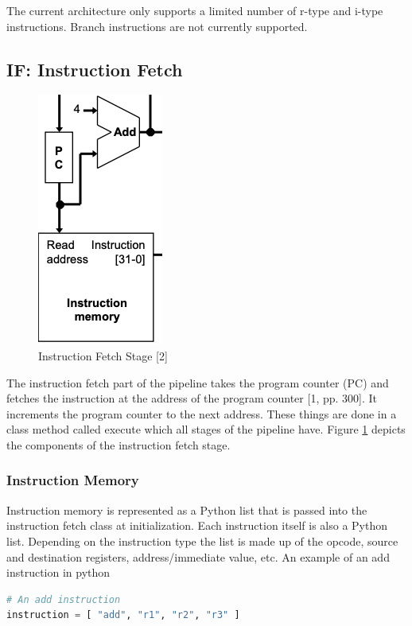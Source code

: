 \documentclass[conference]{IEEEtran}
\begin{document}
The current architecture only supports a limited number of r-type and i-type instructions.  Branch instructions are not currently supported.

\subsection{IF: Instruction Fetch}

\begin{figure}
    \centering
    \includegraphics[scale=.4]{instructionfetch.png}
    \caption{Instruction Fetch Stage [2]}
    \label{fig:instructionfetch}
\end{figure}

The instruction fetch part of the pipeline takes the program counter (PC) and fetches the instruction at the address of the program counter [1, pp. 300].  It increments the program counter to the next address.  These things are done in a class method called execute which all stages of the pipeline have.  Figure \ref{fig:instructionfetch} depicts the components of the instruction fetch stage.

\subsubsection{Instruction Memory}

Instruction memory is represented as a Python list that is passed into the instruction fetch class at initialization.  Each instruction itself is also a Python list.  Depending on the instruction type the list is made up of the opcode, source and destination registers, address/immediate value, etc.  An example of an add instruction in python 

\begin{lstlisting}[language=Python]
# An add instruction
instruction = [ "add", "r1", "r2", "r3" ]
\end{lstlisting}
\end{document}
